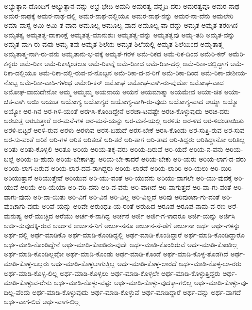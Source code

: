 {ಅಭ್ಯುತ್ಥಾನ-ದೊಂದಿಗೆ
ಅಭ್ಯುತ್ಥಾನ-ವನ್ನು
ಅಭ್ರ-ಭೇದಿ
ಅಮನಿ
ಅಮರತ್ವ-ವನ್ನೈದಿ-ದರು
ಅಮರತ್ವವೂ
ಅಮರ-ನಾಥ
ಅಮರ-ನಾಥಕ್ಕೆ
ಅಮರ-ನಾಥ-ದಲ್ಲಿ
ಅಮರ-ನಾಥ-ದಲ್ಲಿಯೂ
ಅಮರ-ನಾಥ-ನನ್ನು
ಅಮರ-ನಾ-ದೆನು
ಅಮಲೇರಿ
ಅಮಾ-ವಾಸ್ಯೆ
ಅಮಿ
ಅಮಿ-ತ-ವಾದ
ಅಮೂಲ್ಯ
ಅಮೂಲ್ಯ-ವಾದ
ಅಮೂಲ್ಯ-ವಾ-ದದ್ದು
ಅಮೃತ
ಅಮೃತ-ತರಂಗಿಣಿ
ಅಮೃತತ್ವ
ಅಮೃತತ್ವ-ದಾಕಾಂಕ್ಷೆ
ಅಮೃತತ್ವ-ಮಾನುಶುಃ
ಅಮೃತತ್ವ-ವನ್ನು
ಅಮೃತತ್ವವು
ಅಮೃ-ತದಿ
ಅಮೃತ-ವನ್ನು
ಅಮೃತ-ವಾಗಿ-ರು-ವುವು
ಅಮೃ-ತವು
ಅಮೃತ-ಶಿಲೆಯ
ಅಮೃತ-ಶಿಲೆಯಲ್ಲಿ
ಅಮೃತ-ಶಿಲೆಯಿಂದ
ಅಮೃತಾತ್ಮ
ಅಮೃತಾತ್ಮ-ನಾಗಿ-ರು-ವನು
ಅಮೃತಾನು-ಭ-ವಕ್ಕೆ
ಅಮೃತೆ-ಗರಳ
ಅಮೆ-ರಿಕದ
ಅಮೆ-ರಿಕ-ದಿಂದ
ಅಮೆರಿ-ಕನ್
ಅಮೆರಿ-ಕನ್ನರು
ಅಮೆ-ರಿಕಾ
ಅಮೆ-ರಿಕಾಕ್ಕಿಂತಲೂ
ಅಮೆ-ರಿಕಾಕ್ಕೆ
ಅಮೆ-ರಿಕಾದ
ಅಮೆ-ರಿಕಾ-ದಲ್ಲಿ
ಅಮೆ-ರಿಕಾ-ದಲ್ಲಿದ್ದಾಗ
ಅಮೆ-ರಿಕಾ-ದಲ್ಲಿಯೂ
ಅಮೆ-ರಿಕಾ-ದಲ್ಲಿ-ರುವ-ವ-ನೊಬ್ಬನ
ಅಮೆ-ರಿಕಾ-ದ-ವ-ರಿಗೆ
ಅಮೆ-ರಿಕಾ-ದಿಂದ
ಅಮೆ-ರಿಕಾ-ದೇಶೀಯ-ನೊಬ್ಬ
ಅಮೆ-ರಿಕಾ-ವಾಸಿ-ಗಳಂಥ
ಅಮೇರಿ-ಕನ್
ಅಮೋಘ
ಅಮೋಘ-ವಾಗಿ-ರು-ವುದೋ
ಅಮೋಘ-ವಾದ
ಅಮೋಘ-ವಾದುದೇನೋ
ಅಮ್ಮ
ಅಮ್ಮಮ್ಮ
ಅಯನಾಯ
ಅಯನೆ
ಅಯಮಾತ್ಮಾ
ಅಯಮೇವ
ಅಯಾ-ಚಿತ
ಅಯಾ-ಚಿತ-ವಾಗಿ
ಅಯಿ
ಅಯುತ
ಅಯೋಗ್ಯ
ಅಯೋಗ್ಯರ
ಅಯೋಗ್ಯ-ವಾಗಿ-ರು-ವುದು
ಅಯೋಗ್ಯ-ವಾದ
ಅಯ್ಯಾ
ಅಯ್ಯೊ
ಅಯ್ಯೋ
ಅರ-ಗಿನ
ಅರ-ಗಿಳಿ-ಯಂತೆ
ಅರಗಿಸಿ-ಕೊಂಡಿದ್ದೇನೆ
ಅರಚಾ-ಟವಷ್ಟೇ
ಅರಚಿ-ಕೊಳ್ಳುವುದು
ಅರಚಿ-ದರು
ಅರಚುತ್ತ
ಅರಚುತ್ತಾರೆ
ಅರ-ಮನೆ-ಗಳ
ಅರ-ಮನೆ-ಯನ್ನು
ಅರ-ಮನೆ-ಯಲ್ಲಿ
ಅರಳಿತು
ಅರ-ಳಿದ
ಅರ-ಳಿದಂತಾಯಿತು
ಅರಳಿ-ಬಿಟ್ಟರೆ
ಅರಳಿ-ರುವ
ಅರಳು
ಅರಳುವ
ಅರಸ-ಬಹುದೆ
ಅರಸ-ಬೇಕೆ
ಅರಸಿ-ಕೊಂಡು
ಅರ-ಸುತ್ತಿ-ರುವ
ಅರ-ಸುವ
ಅರ-ಸು-ವಂತೆ
ಅರಿಕೆ
ಅರಿ-ಗಳ
ಅರಿತ
ಅರಿತಂತೆ
ಅರಿ-ತರೆ
ಅರಿ-ತಾಗ
ಅರಿ-ತಾದ
ಅರಿ-ತಿದ್ದರು
ಅರಿತಿದ್ದಾನೋ
ಅರಿತಿಲ್ಲ
ಅರಿತು
ಅರಿತು-ಕೊಳ್ಳಲಿ
ಅರಿತೂ
ಅರಿಯ
ಅರಿಯ-ತಕ್ಕ-ವರು
ಅರಿಯ-ದಿರುವೆ
ಅರಿ-ಯದೆ
ಅರಿಯ-ನ-ವನು
ಅರಿಯ-ಬಲ್ಲೆ
ಅರಿಯ-ಬ-ಹುದು
ಅರಿಯ-ಬೇಕಾಗಿತ್ತು
ಅರಿಯ-ಬೇ-ಕಾದರೆ
ಅರಿಯ-ಬೇಕು
ಅರಿ-ಯರು
ಅರಿಯ-ಲಾಗ-ದ-ವರು
ಅರಿಯ-ಲಾಗ-ದಿರುವ
ಅರಿಯ-ಲಾರ-ದವ-ರಾಗಿದ್ದರು
ಅರಿಯ-ಲಾರದೆ
ಅರಿಯ-ಲಾರಿರಿ
ಅರಿ-ಯಲು
ಅರಿ-ಯಿರಿ
ಅರಿಯುತ್ತಾನೆ
ಅರಿಯುತ್ತೇವೆ
ಅರಿಯುವ
ಅರಿ-ಯು-ವಂತೆ
ಅರಿ-ಯುವನು
ಅರಿಯು-ವಾಗಲೇ
ಅರಿ-ಯು-ವುದಕ್ಕೆ
ಅರಿ-ಯುವೆ
ಅರಿಯೆ
ಅರಿ-ಯೆಯಾ
ಅರಿ-ವರಿ-ದನು
ಅರಿ-ವ-ವನು
ಅರಿ-ವಾಗಿದೆ
ಅರಿ-ವಾಗುತ್ತದೆ
ಅರಿ-ವಾ-ಗು-ವಂತೆ
ಅರಿ-ವಾಗು-ವುದು
ಅರಿ-ವಾ-ಯಿತು
ಅರಿ-ವಿಗೆ
ಅರಿ-ವಿನ
ಅರಿ-ವಿಲ್ಲ
ಅರಿ-ವಿಲ್ಲದೆ
ಅರಿವು
ಅರಿವುಂಟಾ-ಗು-ವಂತೆ
ಅರಿ-ವುಂಟಾಗು-ವುದು
ಅರಿವೆ-ಯನ್ನು
ಅರಿವೇ
ಅರುಂಧತಿ-ಯ-ರಂತೆ
ಅರುಹಿದ
ಅರೂಪ
ಅರೂಪ-ನಾಮ-ವ-ರಣ
ಅರೆ-ಮನುಷ್ಯ
ಅರೆ-ಮುಚ್ಚಿದ
ಅರೆಯು
ಅರ್ಚ-ಕ-ನಾಗಿದ್ದ
ಅರ್ಚನೆ
ಅರ್ಜಿ
ಅರ್ಜಿ-ಗ-ಳಾದರೂ
ಅರ್ಜಿ-ಯನ್ನು
ಅರ್ಜಿಸಿ
ಅರ್ಜಿ-ಸುವುದಕ್ಕಿ-ರುವ
ಅರ್ಜುನ
ಅರ್ಜುನ-ನಿಗೆ
ಅರ್ಜು-ನನೂ
ಅರ್ಜುನ-ನೆ-ಡೆಗೆ
ಅರ್ಜುನಾ
ಅರ್ಥ
ಅರ್ಥ-ಗಳನ್ನು
ಅರ್ಥ-ದಲ್ಲಿ
ಅರ್ಥ-ಮಾಡಿಕೊ
ಅರ್ಥ-ಮಾಡಿ-ಕೊಂಡಿದ್ದಲ್ಲಿ
ಅರ್ಥ-ಮಾಡಿ-ಕೊಂಡಿದ್ದಾರೆ
ಅರ್ಥ-ಮಾಡಿ-ಕೊಂಡಿದ್ದಾರೊ
ಅರ್ಥ-ಮಾಡಿ-ಕೊಂಡಿದ್ದೇನೆ
ಅರ್ಥ-ಮಾಡಿ-ಕೊಂಡಿರು-ವುದೇ
ಅರ್ಥ-ಮಾಡಿ-ಕೊಂಡಿರುವೆ
ಅರ್ಥ-ಮಾಡಿ-ಕೊಂಡಿಲ್ಲ
ಅರ್ಥ-ಮಾಡಿ-ಕೊಂಡಿಲ್ಲವೋ
ಅರ್ಥ-ಮಾಡಿ-ಕೊಂಡು
ಅರ್ಥ-ಮಾಡಿ-ಕೊಂಡೆ
ಅರ್ಥ-ಮಾಡಿ-ಕೊಳ್ಳ-ತೊಡಗಿದೆ
ಅರ್ಥ-ಮಾಡಿ-ಕೊಳ್ಳ-ಬಲ್ಲರು
ಅರ್ಥ-ಮಾಡಿ-ಕೊಳ್ಳಲಾಗುತ್ತಿಲ್ಲ
ಅರ್ಥ-ಮಾಡಿ-ಕೊಳ್ಳ-ಲಾರದೆ
ಅರ್ಥ-ಮಾಡಿ-ಕೊಳ್ಳ-ಲಾ-ರರು
ಅರ್ಥ-ಮಾಡಿ-ಕೊಳ್ಳ-ಲಿಲ್ಲ
ಅರ್ಥ-ಮಾಡಿ-ಕೊಳ್ಳಲು
ಅರ್ಥ-ಮಾಡಿ-ಕೊಳ್ಳಲೇ
ಅರ್ಥ-ಮಾಡಿ-ಕೊಳ್ಳುತ್ತಿದ್ದರು
ಅರ್ಥ-ಮಾಡಿ-ಕೊಳ್ಳುವ-ರೇನು
ಅರ್ಥ-ಮಾಡಿ-ಕೊಳ್ಳು-ವಷ್ಟು
ಅರ್ಥ-ಮಾಡಿ-ಕೊಳ್ಳು-ವುದಕ್ಕಾ-ಗಲಿಲ್ಲ
ಅರ್ಥ-ಮಾಡಿ-ಕೊಳ್ಳು-ವು-ದಿಲ್ಲ-ವೆಂದು
ಅರ್ಥ-ಮಾಡಿ-ಕೊಳ್ಳುವುದು
ಅರ್ಥ-ಮಾಡಿ-ಕೊಳ್ಳುವೆ
ಅರ್ಥ-ಮಾಡಿದ್ದಾರೆ
ಅರ್ಥ-ವನ್ನು
ಅರ್ಥ-ವಾಗದೆ
ಅರ್ಥ-ವಾಗ-ಲಿದೆ
ಅರ್ಥ-ವಾಗ-ಲಿಲ್ಲ
}
